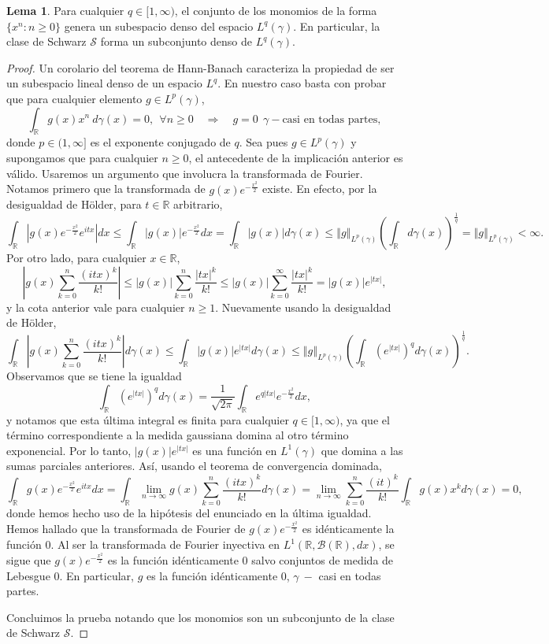 \documentclass[letterpaper,twoside,12pt]{book}
\newcommand{\R}{\mathbb{R}}
\newcommand{\B}{\mathcal{B}}
\renewcommand{\S}{\mathcal{S}}
\newcommand{\1}{\mathds{1}}
\newcommand{\abs}[1]{\left\lvert #1 \right\rvert}
\renewcommand{\to}{\rightarrow}
\newcommand{\ent}{\Longrightarrow}
\newcommand{\norm}[1]{\left\Vert #1 \right\Vert}
\theoremstyle{definition}
\theoremstyle{definition}
\theoremstyle{definition}
\theoremstyle{definition}
\theoremstyle{definition}
\theoremstyle{definition}
\theoremstyle{definition}
\newtheorem{lema}{Lema}
\begin{document}
\begin{lema} 
 Para cualquier $q\in [1,\infty)$, el conjunto de los monomios de la forma $\{x^n: n\geq0\}$ genera un subespacio denso del espacio $L^{q}(\gamma)$. En particular, la clase de Schwarz $\S$ forma un subconjunto denso de $L^q(\gamma)$.
 \end{lema}
 \begin{proof} 
    Un corolario del teorema de Hann-Banach caracteriza la propiedad de ser un subespacio lineal denso de un espacio $L^{q}$. En nuestro caso basta con probar que para cualquier elemento $g \in L^{p}(\gamma)$, 
    \[
    \int_\R g(x)x^{n} \ d\gamma(x)=0, \ \ \forall n\geq0  \quad \ent \quad g=0 \ \ \gamma- \text{casi en todas partes},
    \]
    donde $p\in (1,\infty]$ es el exponente conjugado de $q$. Sea pues $g\in L^{p}(\gamma)$ y supongamos que para cualquier $n\geq0$, el antecedente de la implicación anterior es válido. Usaremos un argumento que involucra la transformada de Fourier. Notamos primero que la transformada de $g(x)e^{-\frac{x^2}{2}}$ existe. En efecto, por la desigualdad de Hölder, para $t\in \R$ arbitrario,
    \[
    \int_{\R}|g(x)e^{-\frac{x^2}{2}}e^{itx}|dx\leq \int_{\R}|g(x)|e^{-\frac{x^2}{2}}dx=\int_{\R}|g(x)|d\gamma(x)\leq\norm{g}_{L^{p}(\gamma)}\left(\int_{\R}d\gamma(x)\right)^{\frac{1}{q}}= \norm{g}_{L^{p}(\gamma)}<\infty.
    \]
    Por otro lado, para cualquier $x\in \R$,  
    \[
    \abs{g(x)\sum_{k=0}^{n}\frac{(itx)^k}{k!}}\leq |g(x)|\sum_{k=0}^{n}\frac{|tx|^{k}}{k!}\leq |g(x)|\sum_{k=0}^{\infty}\frac{|tx|^{k}}{k!}=|g(x)|e^{|tx|},
    \]
    y la cota anterior vale para cualquier $n\geq1$. Nuevamente usando la desigualdad de Hölder,
    \[
    \int_\R\abs{g(x)\sum_{k=0}^{n}\frac{(itx)^{k}}{k!}}d\gamma(x)\leq \int_\R |g(x)|e^{|tx|}d\gamma(x)\leq \norm{g}_{L^{p}(\gamma)}\left(\int_\R (e^{|tx|})^qd\gamma(x)\right)^{\frac{1}{q}}. 
    \]
    Observamos que se tiene la igualdad 
    \[
    \int_\R (e^{|tx|})^{q}d\gamma(x)=\frac{1}{\sqrt{2\pi}}\int_\R e^{q|tx|}e^{-\frac{x^2}{2}}dx,
    \]
    y notamos que esta última integral es finita para cualquier $q\in [1,\infty)$, ya que el término correspondiente a la medida gaussiana domina al otro término exponencial. Por lo tanto, $|g(x)|e^{|tx|}$ es una función en $L^{1}(\gamma)$ que domina a las sumas parciales anteriores. Así, usando el teorema de convergencia dominada, 
    \[
    \int_\R g(x)e^{-\frac{x^2}{2}}e^{itx}dx=\int_\R \lim_{n\to \infty} g(x)\sum_{k=0}^{n}\frac{(itx)^k}{k!}d\gamma(x)=\lim_{n\to \infty}\sum_{k=0}^{n}\frac{(it)^k}{k!}\int_\R g(x)x^k d\gamma(x)=0, 
    \]
    donde hemos hecho uso de la hipótesis del enunciado en la última igualdad. Hemos hallado que la transformada de Fourier de $g(x)e^{-\frac{x^2}{2}}$ es idénticamente la función 0. Al ser la transformada de Fourier inyectiva en $L^{1}(\R,\B(\R),dx)$, se sigue que $g(x)e^{-\frac{x^2}{2}}$ es la función idénticamente 0 salvo conjuntos de medida de Lebesgue 0. En particular, $g$ es la función idénticamente 0, $\gamma \ -$ casi en todas partes.  

    Concluimos la prueba notando que los monomios son un subconjunto de la clase de Schwarz $\S$.
  \end{proof}
\end{document}
